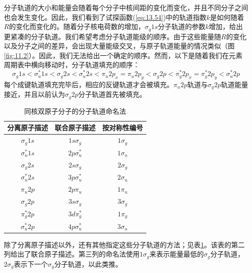     分子轨道的大小和能量会随着每个分子中核间距的变化而变化，并且不同分子之间也会发生变化。因此，我们看到了试探函数(\ref{eq:13.54})中的轨道指数$k$是如何随着$R$的变化而变化的。随着分子核电荷数的增加，$\sigma_g1s$分子轨道的参数$k$增加，给出更紧凑的分子轨道。我们希望考虑分子轨道能级的顺序。由于这些能量随$R$的变化以及分子之间的差异，会出现大量能级交叉，与原子轨道能量的情况类似（图\ref{fig:11.2}）。因此，我们无法给出一个确定的顺序。然而，以下是随着我们在元素周期表中横向移动时，分子轨道填充的顺序：
    \begin{equation*}
        \sigma_g 1s < \sigma_u^* 1s < \sigma_g 2s < \sigma_u^* 2s < \pi_u 2p_x = \pi_u 2p_y < \sigma_g 2p < \pi_g^* 2p_x = \pi_g^* 2p_y < \sigma_u^* 2p
    \end{equation*}
    每个成键轨道填充完毕后，相应的反键轨道才会被填充。$\pi_u2p$轨道与$\sigma_g2p$轨道能量接近，并且以前认为$\sigma_g2p$分子轨道首先被填充。
    \begin{table}[htbp]
        \centering
        \renewcommand{\arraystretch}{1.2}
        \begin{tabular}{|c|c|c|}
            \hline
            分离原子描述 & 联合原子描述 & 按对称性编号 \\
            \hline
            $\sigma_g 1s$ & $1s\sigma_g$ & $1\sigma_g$ \\
            \hline
            $\sigma_u^* 1s$ & $2p\sigma_u^*$ & $1\sigma_u$ \\
            \hline
            $\sigma_g 2s$ & $2s\sigma_g$ & $2\sigma_g$ \\
            \hline
            $\sigma_u^* 2s$ & $3p\sigma_u^*$ & $2\sigma_u$ \\
            \hline
            $\pi_u 2p$ & $2p\pi_u$ & $1\pi_u$ \\
            \hline
            $\sigma_g 2p$ & $3s\sigma_g$ & $3\sigma_g$ \\
            \hline
            $\pi_g^* 2p$ & $3d\pi_g^*$ & $1\pi_g$ \\
            \hline
            $\sigma_u^* 2p$ & $4p\sigma_u^*$ & $3\sigma_u$ \\
            \hline
        \end{tabular}
        \caption{同核双原子分子的分子轨道命名法}
        \label{tab:13.1}
    \end{table}

    除了分离原子描述以外，还有其他指定这些分子轨道的方法；见表\ref{tab:13.1}。该表的第二列给出了联合原子描述。第三列的命名法使用$1\sigma_g$来表示能量最低的$\sigma_g$分子轨道，$2\sigma_g$表示下一个$\sigma_g$分子轨道，以此类推。

